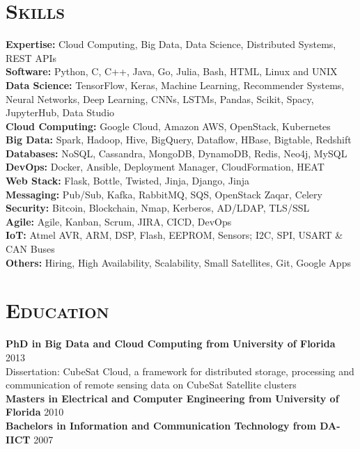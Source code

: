 \begin{resume}
\section{\textsc{Skills}}
{\bf Expertise:} Cloud Computing, Big Data, Data Science, Distributed Systems, REST APIs
\\ {\bf Software:} Python, C, C++, Java, Go, Julia, Bash, HTML, Linux and UNIX
\\ {\bf Data Science:} TensorFlow, Keras, Machine Learning, Recommender Systems, Neural Networks, Deep Learning, CNNs, LSTMs, Pandas, Scikit, Spacy, JupyterHub, Data Studio
\\ {\bf Cloud Computing:} Google Cloud, Amazon AWS, OpenStack, Kubernetes
\\ {\bf Big Data:} Spark, Hadoop, Hive, BigQuery, Dataflow, HBase, Bigtable, Redshift
\\ {\bf Databases:} NoSQL, Cassandra, MongoDB, DynamoDB, Redis, Neo4j, MySQL
\\ {\bf DevOps:} Docker, Ansible, Deployment Manager, CloudFormation, HEAT
\\ {\bf Web Stack:} Flask, Bottle, Twisted, Jinja, Django, Jinja
\\ {\bf Messaging:} Pub/Sub, Kafka, RabbitMQ, SQS, OpenStack Zaqar, Celery
\\ {\bf Security:} Bitcoin, Blockchain, Nmap, Kerberos, AD/LDAP, TLS/SSL
\\ {\bf Agile:} Agile, Kanban, Scrum, JIRA, CICD, DevOps
\\ {\bf IoT:} Atmel AVR, ARM, DSP, Flash, EEPROM, Sensors; I2C, SPI, USART \& CAN Buses
\\ {\bf Others:} Hiring, High Availability, Scalability, Small Satellites, Git, Google Apps


\section{\textsc{Education}}
\textbf{PhD in Big Data and Cloud Computing from University of Florida} \hfill 2013 \\
Dissertation: CubeSat Cloud, a framework for distributed storage, processing and communication of remote sensing data on CubeSat Satellite clusters\\
\textbf{Masters in Electrical and Computer Engineering from University of Florida} \hfill 2010 \\
\textbf{Bachelors in Information and Communication Technology from DA-IICT} \hfill 2007


\end{resume}
